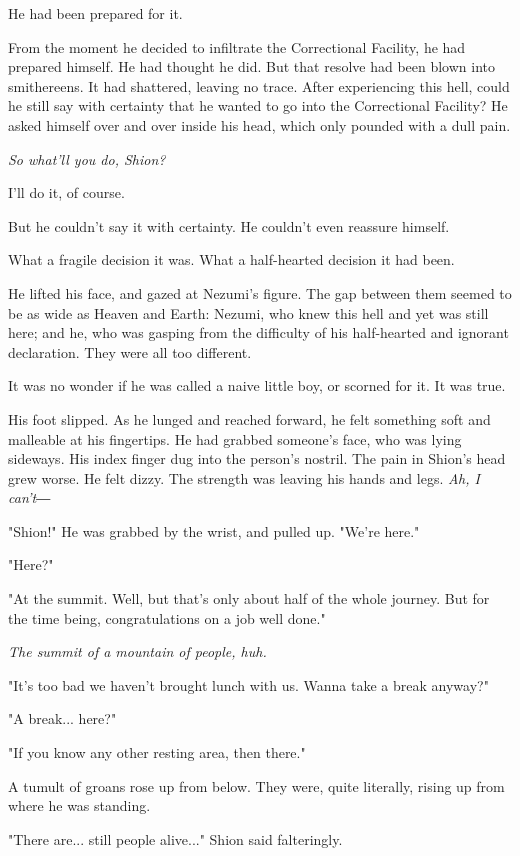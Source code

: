 He had been prepared for it.

From the moment he decided to infiltrate the Correctional Facility, he
had prepared himself. He had thought he did. But that resolve had been
blown into smithereens. It had shattered, leaving no trace. After
experiencing this hell, could he still say with certainty that he wanted
to go into the Correctional Facility? He asked himself over and over
inside his head, which only pounded with a dull pain.

\emph{So what'll you do, Shion?}

I'll do it, of course.

But he couldn't say it with certainty. He couldn't even reassure
himself.

What a fragile decision it was. What a half-hearted decision it had
been.

He lifted his face, and gazed at Nezumi's figure. The gap between them
seemed to be as wide as Heaven and Earth: Nezumi, who knew this hell and
yet was still here; and he, who was gasping from the difficulty of his
half-hearted and ignorant declaration. They were all too different.

It was no wonder if he was called a naive little boy, or scorned for it.
It was true.

His foot slipped. As he lunged and reached forward, he felt something
soft and malleable at his fingertips. He had grabbed someone's face, who
was lying sideways. His index finger dug into the person's nostril. The
pain in Shion's head grew worse. He felt dizzy. The strength was leaving
his hands and legs. \emph{Ah, I can't―}

"Shion!" He was grabbed by the wrist, and pulled up. "We're here."

"Here?"

"At the summit. Well, but that's only about half of the whole journey.
But for the time being, congratulations on a job well done."

\emph{The summit of a mountain of people, huh.}

"It's too bad we haven't brought lunch with us. Wanna take a break
anyway?"

"A break... here?"

"If you know any other resting area, then there."

A tumult of groans rose up from below. They were, quite literally,
rising up from where he was standing.

"There are... still people alive..." Shion said falteringly.

